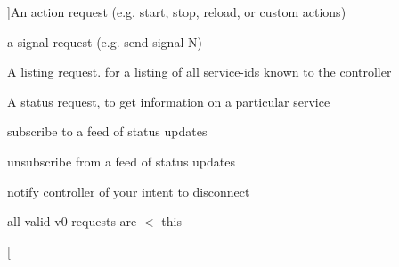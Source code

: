 \begin{Desc}
\begin{description}
{}]An action request (e.g. start, stop, reload, or custom actions) \item[{\em 
UPK\_\-REQ\_\-SIGNAL\label{tp_8c_gab04f5fc5314f6296f0ef4b171d1b4282a18577c0608f2efad2dc0f8465a655b54}
}]a signal request (e.g. send signal N) \item[{\em 
UPK\_\-REQ\_\-LIST\label{tp_8c_gab04f5fc5314f6296f0ef4b171d1b4282a214198b799b71f6705738276654176bc}
}]A listing request. for a listing of all service-\/ids known to the controller \item[{\em 
UPK\_\-REQ\_\-STATUS\label{tp_8c_gab04f5fc5314f6296f0ef4b171d1b4282ae002aeb3886facb9128f69cb6d759ac2}
}]A status request, to get information on a particular service \item[{\em 
UPK\_\-REQ\_\-SUBSCRIBE\label{tp_8c_gab04f5fc5314f6296f0ef4b171d1b4282afcbcfdd7d845ec9e37e7e3a22099ffd9}
}]subscribe to a feed of status updates \item[{\em 
UPK\_\-REQ\_\-UNSUBSCRIBE\label{tp_8c_gab04f5fc5314f6296f0ef4b171d1b4282a3a207b0c96d2936ebed88675937c2975}
}]unsubscribe from a feed of status updates \item[{\em 
UPK\_\-REQ\_\-DISCONNECT\label{tp_8c_gab04f5fc5314f6296f0ef4b171d1b4282a0b4801fa26542f7fa70286275175ee07}
}]notify controller of your intent to disconnect \item[{\em 
UPK\_\-REQ\_\-V0\_\-PROTO\_\-LIMIT\label{tp_8c_gab04f5fc5314f6296f0ef4b171d1b4282a47f2714f45ebd848d8dc1cfa2ecd1444}
}]all valid v0 requests are $<$ this \item[{\em 
}
\end{description}
\end{Desc}
